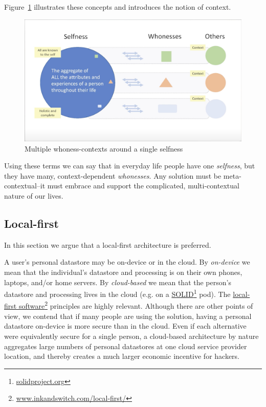 \documentclass[11pt, oneside]{article}   	%
\newcommand{\hyperfootnote}[1][]{\def\ArgI{{#1}}\hyperfootnoteRelay}
\newcommand\hyperfootnoteRelay[2][]{\href{#1#2}{\ArgI}\footnote{\href{#1#2}{#2}}}
\begin{document}
Figure~\ref{fig:multiple-contexts} illustrates these concepts and introduces the notion of context.

\begin{figure}[htbp]
\includegraphics[width=\textwidth]{./images/selfness-and-whoness-larger.png}
\caption{Multiple whoness-contexts around a single selfness}
\label{fig:multiple-contexts}
\end{figure}

Using these terms we can say that in everyday life people have one \emph{selfness}, but they have many, context-dependent \emph{whonesses}. Any solution must be meta-contextual--it must embrace and support the complicated, multi-contextual nature of our lives.

\subsection{Local-first}

In this section we argue that a local-first architecture is preferred. 

A user's personal datastore may be on-device or in the cloud. By \emph{on-device} we mean that the individual's datastore and processing is on their own phones, laptops, and/or home servers. By \emph{cloud-based} we mean that the person's datastore and processing lives in the cloud (e.g. on a \hyperfootnote[SOLID][https://]{solidproject.org} pod). The \hyperfootnote[local-first software][https://]{www.inkandswitch.com/local-first/} principles are highly relevant. Although there are other points of view, we contend that if many people are using the solution, having a personal datastore on-device is more secure than in the cloud. Even if each alternative were equivalently secure for a single person, a cloud-based architecture by nature aggregates large numbers of personal datastores at one cloud service provider location, and thereby creates a much larger economic incentive for hackers. 
\end{document}
